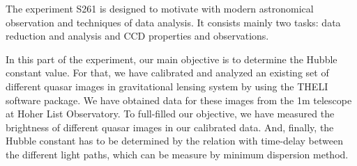 The experiment S261 is designed to motivate with modern astronomical observation and techniques of data analysis. It consists mainly two tasks: data reduction and analysis and CCD properties and observations. 

In this part of the experiment, our main objective is to determine the Hubble constant value. For that, we have calibrated and analyzed an existing set of different quasar images in gravitational lensing system by using the THELI software package. We have obtained data for these images from the 1m telescope at Hoher List Observatory. To full-filled our objective, we have measured the brightness of different quasar images in our calibrated data. And, finally, the Hubble constant has to be determined by the relation with time-delay between the different light paths, which can be measure by minimum dispersion method.
